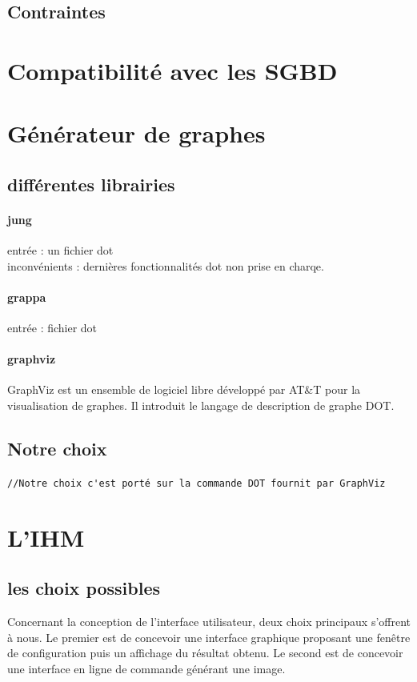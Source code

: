 	\subsection{Contraintes}

\section{Compatibilité avec les SGBD}

\section{Générateur de graphes}
  \subsection{différentes librairies}
		\paragraph{jung}
				entrée : un fichier dot\\
				inconvénients : dernières fonctionnalités dot non prise en charqe.
		\paragraph{grappa}
				 entrée : fichier dot
		\paragraph{graphviz}
			GraphViz est un ensemble de logiciel libre développé par AT\&T pour la visualisation de graphes. Il introduit le langage de description de graphe DOT.
				
  \subsection{Notre choix}
		\verb+//Notre choix c'est porté sur la commande DOT fournit par GraphViz+


\section{L'IHM}	
	\subsection{les choix possibles}
	\label{ihm_choix_possibles}
		Concernant la conception de l'interface utilisateur, deux choix principaux s'offrent à nous. Le premier est de concevoir
une interface graphique proposant une fenêtre de configuration puis un affichage du résultat obtenu. Le second est de concevoir 	une interface en ligne de commande générant une image. 	
	
